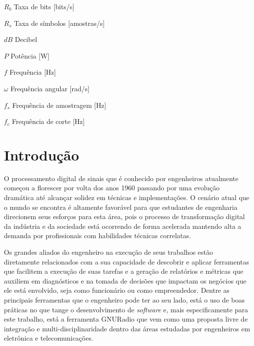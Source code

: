 \documentclass[
  12pt,				%
  openright,			%
  twoside,			%
  a4paper,			%
  english,			%
  french,				%
  spanish,			%
  brazil,				%
  ]{abntex2}
\begin{document}
\begin{simbolos}
  \item[$ R_b $] Taxa de bits [bits/s]
  \item[$ R_s $] Taxa de símbolos [amostras/s]
  \item[$ dB $] Decibel
  \item[$ P $] Potência [W]
  \item[$f$] Frequência [Hz]
  \item[$\omega$] Frequência angular [rad/s]
  \item[$f_s$] Frequência de amostragem [Hz]
  \item[$f_c$] Frequência de corte [Hz]
\end{simbolos}

\tableofcontents*
\cleardoublepage

\textual

\chapter*[Introdução]{Introdução}

O processamento digital de sinais que é conhecido por engenheiros atualmente começou a florescer por volta dos anos 1960 \cite{hayes:1999} passando por uma evolução
dramática até alcançar solidez em técnicas e implementações. O cenário atual que o mundo se encontra é altamente favorável para que estudantes de engenharia
direcionem seus esforços para esta área, pois o processo de transformação digital da indústria e da sociedade está ocorrendo de forma acelerada
\cite{ebert:digital_transformation} mantendo alta a demanda por profissionais com habilidades técnicas correlatas.

Os grandes aliados do engenheiro na execução de seus trabalhos estão diretamente relacionados com a sua capacidade de descobrir e aplicar ferramentas que facilitem a execução de suas
tarefas e a geração de relatórios e métricas que auxiliem em diagnósticos e na tomada de decisões que impactam os negócios que ele está envolvido, seja como funcionário ou como empreendedor.
Dentre as principais ferramentas que o engenheiro pode ter ao seu lado, está o uso de boas práticas no que tange o desenvolvimento de \textit{software} e, mais especificamente para este trabalho,
está a ferramenta GNURadio que vem como uma proposta livre de integração e multi-disciplinaridade dentro das áreas estudadas por engenheiros em eletrônica e telecomunicações.
\end{document}
